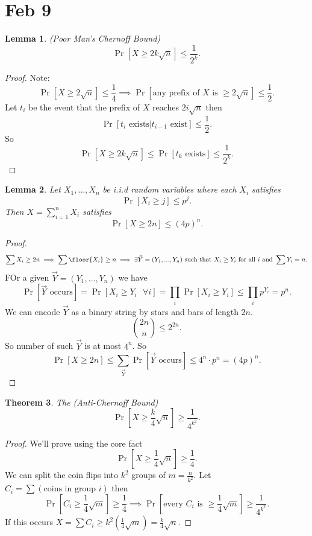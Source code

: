 \documentclass[a4paper]{article}
\newtheorem{thm}{Theorem}[section]
\newtheorem{lem}[thm]{Lemma}
\begin{document}
\section{Feb 9}
\begin{lem}
    (Poor Man's Chernoff Bound) \[
    \Pr[X \geq 2k \sqrt{n}] \leq \frac{1}{2^k}
    .\] 
\end{lem}
\begin{proof}
    Note: \[
    \Pr[X\geq 2\sqrt{n}] \leq \frac{1}{4} \tag{Chebyshev's Inequality}\implies \Pr[ \text{any prefix of $X$ is } \geq 2\sqrt{n}]\leq \frac{1}{2}
    .\] 
    Let $t_i$ be the event that the prefix of $X$ reaches $2i\sqrt{n}$ then \[
    \Pr[t_i \text{ exists} | {t_{i-1} \text{ exist}}  ]\leq \frac{1}{2}
    .\] 
    So \[
    \Pr[X \geq 2k\sqrt{n}] \leq \Pr[t_k \text{ exists}] \leq \frac{1}{2^k}
    .\] 
\end{proof}
\begin{lem}
    Let $X_1,...,X_n$ be i.i.d random variables where each $X_i$ satisfies \[
    \Pr[X_i \geq j] \leq p^j
    .\] 
    Then $X=\sum_{i=1}^n X_i$ satisfies \[
    \Pr[X\geq 2n]\leq (4p)^n
    .\] 
\end{lem}
\begin{proof}
    \[
    \sum X_i \geq 2n \implies \sum \floor{X_i}\geq n \implies \exists \vec{Y}=(Y_1,...,Y_n) \text{ such that } X_i\geq Y_i \text{ for all $i$ and } \sum Y_i= n 
    .\] 
    FOr a given $\vec{Y}=(Y_1,...,Y_n)$ we have \[
    \Pr[\vec{Y} \text{ occurs}] = \Pr[X_i\geq Y_i \text{ }\forall i]= \prod_i \Pr[X_i \geq Y_i] \leq \prod_i p^{Y_i} = p^n
    .\] 
    We can encode $\vec{Y}$ as a binary string by stars and bars of length $2n.$ \[
    {2n \choose n} \leq 2^{2n}
    .\] 
    So number of such $\vec{Y}$ is at most $4^n$. So \[
    \Pr[X \geq 2n] \leq \sum_{\vec{Y}} \Pr[\vec{Y} \text{ occurs}] \leq 4^n \cdot p^n = (4p)^n
    .\] 
\end{proof}
\begin{thm}
    The (Anti-Chernoff Bound) \[
    \Pr[X\geq \frac{k}{4}\sqrt{n}] \geq \frac{1}{4^{k^2}}
    .\] 
\end{thm}
\begin{proof}
    We'll prove using the core fact \[
    \Pr[X \geq \frac{1}{4}\sqrt{n}] \geq \frac{1}{4}
    .\] 
    We can split the coin flips into $k^2$ groups of $m=\frac{n}{k^2}$. Let $C_i=\sum( \text{coins in group $i$})$ then \[
    \Pr[C_i \geq \frac{1}{4}\sqrt{m}]\geq \frac{1}{4} \implies \Pr[ \text{every $C_i$ is } \geq \frac{1}{4}\sqrt{m}] \geq \frac{1}{4^{k^2}}
    .\] 
    If this occurs $X=\sum C_i \geq k^2 (\frac{1}{4}\sqrt{m})=\frac{k}{4}\sqrt{n}$. 
\end{proof}
\end{document}

